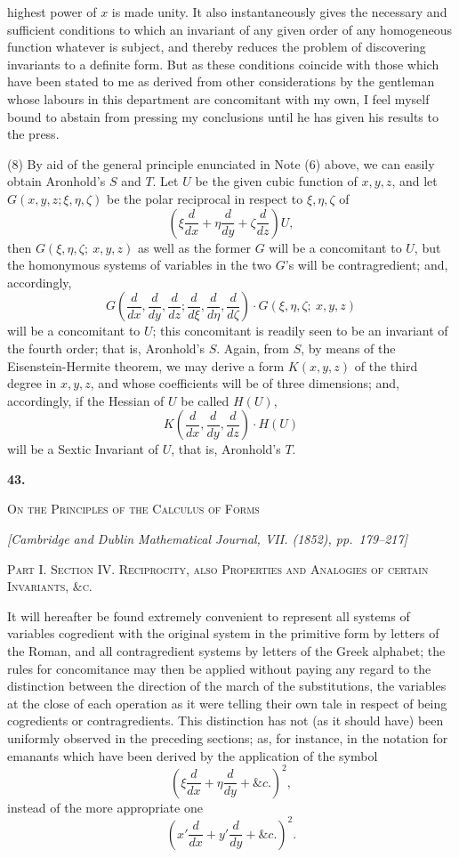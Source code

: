 \documentclass[11pt]{article}
\newcommand{\paperhead}[3]{%
  \clearpage
  \begin{center}
  {\Large\bfseries #1.}\par\vspace{0.85em}
  {\large\scshape #2}\par\vspace{0.6em}
  {\itshape [#3]}\par
  \end{center}\vspace{0.4em}}
\newcommand{\subpaperhead}[1]{\begin{center}{\large\scshape #1}\end{center}}
\newcommand{\sourcepage}[1]{\marginpar{\scriptsize p.~#1}}
\begin{document}
{{\sourcepage{327}
highest power of $x$ is made unity. It also instantaneously gives the necessary and sufficient conditions to which an invariant of any given order of any homogeneous function whatever is subject, and thereby reduces the problem of discovering invariants to a definite form. But as these conditions coincide with those which have been stated to me as derived from other considerations by the gentleman whose labours in this department are concomitant with my own, I feel myself bound to abstain from pressing my conclusions until he has given his results to the press.

(8) By aid of the general principle enunciated in Note (6) above, we can easily obtain Aronhold's $S$ and $T$. Let $U$ be the given cubic function of $x,y,z$, and let $G(x,y,z;\xi,\eta,\zeta)$ be the polar reciprocal in respect to $\xi,\eta,\zeta$ of
\[
\left(\xi\frac{d}{dx}+\eta\frac{d}{dy}+\zeta\frac{d}{dz}\right)U,
\]
then $G(\xi,\eta,\zeta;\ x,y,z)$ as well as the former $G$ will be a concomitant to $U$, but the homonymous systems of variables in the two $G$'s will be contragredient; and, accordingly,
\[
G\left(\frac{d}{dx},\frac{d}{dy},\frac{d}{dz};\frac{d}{d\xi},\frac{d}{d\eta},\frac{d}{d\zeta}\right)\cdot
G(\xi,\eta,\zeta;\ x,y,z)
\]
will be a concomitant to $U$; this concomitant is readily seen to be an invariant of the fourth order; that is, Aronhold's $S$. Again, from $S$, by means of the Eisenstein-Hermite theorem, we may derive a form $K(x,y,z)$ of the third degree in $x,y,z$, and whose coefficients will be of three dimensions; and, accordingly, if the Hessian of $U$ be called $H(U)$,
\[
K\left(\frac{d}{dx},\frac{d}{dy},\frac{d}{dz}\right)\cdot H(U)
\]
will be a Sextic Invariant of $U$, that is, Aronhold's $T$.


\paperhead{43}{On the Principles of the Calculus of Forms}{Cambridge and Dublin Mathematical Journal, VII. (1852), pp.~179--217}

\subpaperhead{Part I. \quad Section IV. \quad Reciprocity, also Properties and Analogies of certain Invariants, \&c.}

\sourcepage{328}
It will hereafter be found extremely convenient to represent all systems of variables cogredient with the original system in the primitive form by letters of the Roman, and all contragredient systems by letters of the Greek alphabet; the rules for concomitance may then be applied without paying any regard to the distinction between the direction of the march of the substitutions, the variables at the close of each operation as it were telling their own tale in respect of being cogredients or contragredients. This distinction has not (as it should have) been uniformly observed in the preceding sections; as, for instance, in the notation for emanants which have been derived by the application of the symbol
\[
\left(\xi\frac{d}{dx}+\eta\frac{d}{dy}+\&c.\right)^2,
\]
instead of the more appropriate one
\[
\left(x'\frac{d}{dx}+y'\frac{d}{dy}+\&c.\right)^2.
\]

}}
\end{document}
